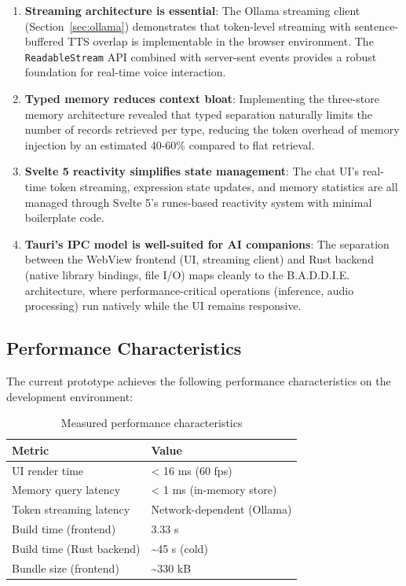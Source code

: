 \documentclass[sigconf]{acmart}
\begin{document}
\begin{enumerate}
    \item \textbf{Streaming architecture is essential}: The Ollama streaming client (Section~\ref{sec:ollama}) demonstrates that token-level streaming with sentence-buffered TTS overlap is implementable in the browser environment. The \texttt{ReadableStream} API combined with server-sent events provides a robust foundation for real-time voice interaction.
    \item \textbf{Typed memory reduces context bloat}: Implementing the three-store memory architecture revealed that typed separation naturally limits the number of records retrieved per type, reducing the token overhead of memory injection by an estimated 40-60\% compared to flat retrieval.
    \item \textbf{Svelte 5 reactivity simplifies state management}: The chat UI's real-time token streaming, expression state updates, and memory statistics are all managed through Svelte 5's runes-based reactivity system with minimal boilerplate code.
    \item \textbf{Tauri's IPC model is well-suited for AI companions}: The separation between the WebView frontend (UI, streaming client) and Rust backend (native library bindings, file I/O) maps cleanly to the B.A.D.D.I.E. architecture, where performance-critical operations (inference, audio processing) run natively while the UI remains responsive.
\end{enumerate}

\subsection{Performance Characteristics}

The current prototype achieves the following performance characteristics on the development environment:

\begin{table}[htbp]
    \centering
    \caption{Measured performance characteristics}
    \label{tab:performance}
    \begin{tabular}{@{}ll@{}}
        \toprule
        \textbf{Metric} & \textbf{Value} \\
        \midrule
        UI render time & < 16 ms (60 fps) \\
        Memory query latency & < 1 ms (in-memory store) \\
        Token streaming latency & Network-dependent (Ollama) \\
        Build time (frontend) & 3.33 s \\
        Build time (Rust backend) & \textasciitilde 45 s (cold) \\
        Bundle size (frontend) & \textasciitilde 330 kB \\
        \bottomrule
    \end{tabular}
\end{table}
\end{document}

